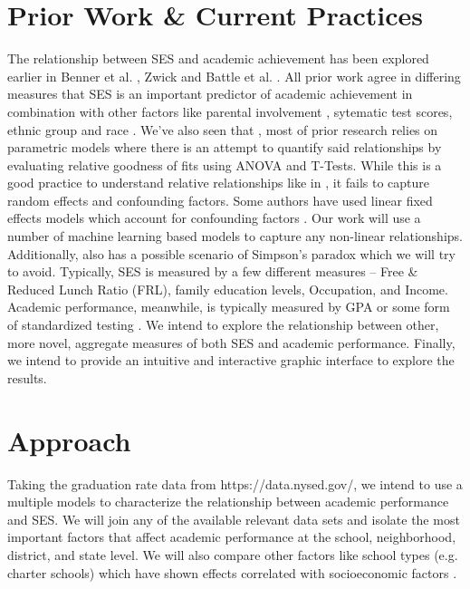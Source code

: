 \documentclass[sigconf,nonacm,11pt]{acmart}
\begin{document}
\section{Prior Work \& Current Practices}

The relationship between SES and academic achievement has been explored earlier in Benner et al. \cite{parentalinvolvement}, Zwick \cite{collegescores} and Battle et al. \cite{raceses}. All prior work agree in differing measures that SES is an important predictor of academic achievement in combination with other factors like parental involvement \cite{parentalinvolvement}, sytematic test scores, ethnic group \cite{collegescores} and race \cite{raceses}. We've also seen that \cite{parentalinvolvement, collegescores, raceses, farooq}, most of prior research relies on parametric models where there is an attempt to quantify said relationships by evaluating relative goodness of fits using ANOVA and T-Tests. While this is a good practice to understand relative relationships like in \cite{collegescores, raceses}, it fails to capture random effects and confounding factors. Some authors have used linear fixed effects models which account for confounding factors \cite{winters, jinnai}. Our work will use a number of machine learning based models to capture any non-linear relationships. Additionally, \cite{collegescores} also has a possible scenario of Simpson's paradox which we will try to avoid. Typically, \cite{sirin} SES is measured by a few different measures -- Free \& Reduced Lunch Ratio (FRL), family education levels, Occupation, and Income.  Academic performance, meanwhile, is typically measured by GPA or some form of standardized testing \cite{sirin}.  We intend to explore the relationship between other, more novel, aggregate measures of both SES and academic performance. Finally, we intend to provide an intuitive and interactive graphic interface to explore the results.

\section{Approach}
Taking the graduation rate data from https://data.nysed.gov/, we intend to use a multiple models to characterize the relationship between academic performance and SES.  We will join any of the available relevant data sets and isolate the most important factors that affect academic performance at the school, neighborhood, district, and state level. We will also compare other factors like school types (e.g. charter schools) which have shown effects correlated with socioeconomic factors \cite{west}.
\end{document}

